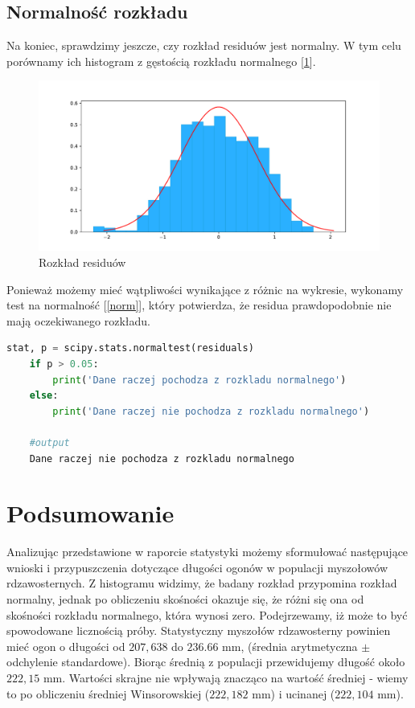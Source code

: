 \documentclass{article}
\theoremstyle{break}
\begin{document}
\subsection{Normalność rozkładu}

Na koniec, sprawdzimy jeszcze, czy rozkład residuów jest normalny. W tym celu porównamy ich histogram z gęstością rozkładu normalnego [\ref{fig:res_hist}]. 
\begin{figure}[H]
	\begin{center}
		\includegraphics[scale=0.5]{res_hist.pdf}
		\caption{Rozkład residuów}
		\label{fig:res_hist}
	\end{center}
\end{figure}

 Ponieważ możemy mieć wątpliwości wynikające z różnic na wykresie, wykonamy test na normalność [\ref{norm}], który potwierdza, że residua prawdopodobnie nie mają oczekiwanego rozkładu.

\begin{lstlisting}[language=Python, caption=Test Levene'a, label={norm}]
	stat, p = scipy.stats.normaltest(residuals)
	if p > 0.05:
		print('Dane raczej pochodza z rozkladu normalnego')
	else:
		print('Dane raczej nie pochodza z rozkladu normalnego')
		
	#output
	Dane raczej nie pochodza z rozkladu normalnego
\end{lstlisting}

	
\section{Podsumowanie}
	Analizując przedstawione w raporcie statystyki możemy sformułować następujące wnioski i przypuszczenia dotyczące długości ogonów w populacji myszołowów rdzawosternych. Z histogramu widzimy, że badany rozkład przypomina rozkład normalny, jednak po obliczeniu skośności okazuje się, że różni się ona od skośności rozkładu normalnego, która wynosi zero. Podejrzewamy, iż może to być spowodowane licznością próby. Statystyczny myszołów rdzawosterny powinien mieć ogon o długości od $207,638$ do $236.66$ mm, (średnia arytmetyczna $\pm$ odchylenie standardowe). Biorąc średnią z populacji przewidujemy długość około $222,15$ mm. Wartości skrajne nie wpływają znacząco na wartość średniej - wiemy to po obliczeniu średniej Winsorowskiej ($222,182$ mm) i ucinanej ($222,104$ mm). 
	
\end{document}
